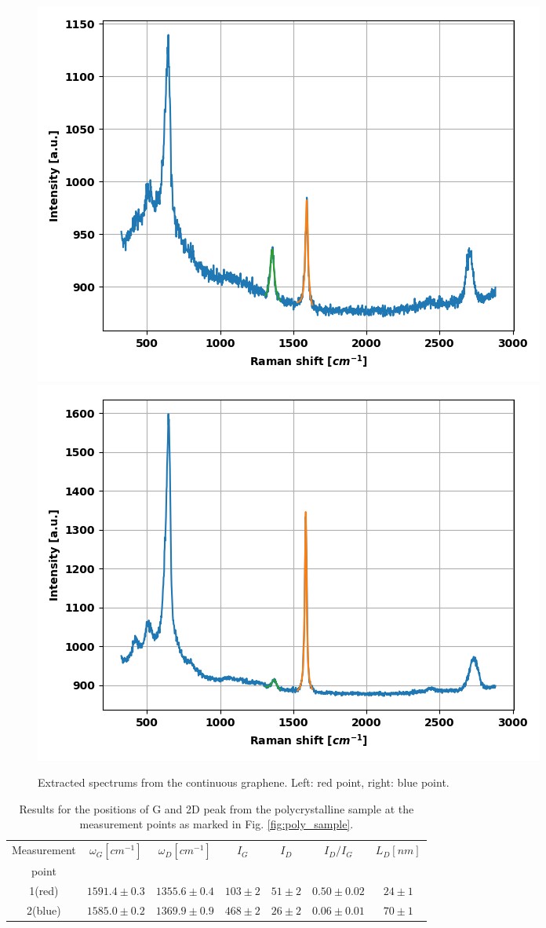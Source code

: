 \documentclass[12pt,a4paper]{article}
\begin{document}
\begin{figure}
\centering
\includegraphics[scale=0.5]{Bilder/part7/1.png}
\includegraphics[scale=0.5]{Bilder/part7/2.png}
\caption{Extracted spectrums from the continuous graphene. Left: red point, right: blue point.}
\label{fig:part7_spectrum}
\end{figure}

\begin{table}
\centering
\begin{tabular}{|c|c|c|c|c|c|c|}
\hline 
Measurement &  $\omega_G[cm^{-1}]$  & $\omega_D[cm^{-1}]$& $I_G$ & $I_D$ & $I_D/I_G $ & $L_D[nm]$\\ 
point &  &  & & & &\\ 
\hline
1(red) & $1591.4 \pm 0.3$ & $1355.6 \pm 0.4$ & $103 \pm 2$ & $51 \pm 2$ & $0.50 \pm 0.02$ & $24\pm 1$\\ 
\hline
2(blue) & $1585.0 \pm 0.2$ & $1369.9 \pm 0.9$ & $468 \pm 2$ & $26 \pm 2$ & $0.06 \pm 0.01$ & $70\pm 1$\\ 
\hline
\end{tabular} 
\caption{Results for the positions of G and 2D peak from the polycrystalline sample at the measurement points as marked in Fig. \ref{fig:poly_sample}.}
\label{tab:part7_results}
\end{table}
\end{document}
